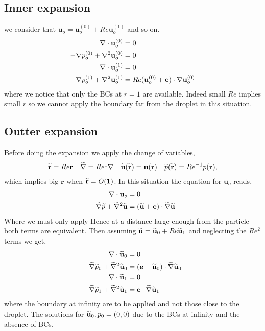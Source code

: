 \subsection{Inner expansion}
we consider that $\textbf{u}_o = \textbf{u}_o^{(0)} + Re \textbf{u}_o^{(1)}$ and so on.
\begin{align}
    \mathbf{\nabla}\cdot \textbf{u}_o^{(0)} &= 0
    \\
    -\mathbf{\nabla} p_o^{(0)} + \mathbf{\nabla}^2 \textbf{u}_o^{(0)}
    &= 0\\
    \mathbf{\nabla}\cdot \textbf{u}_o^{(1)} &= 0
    \\
    -\mathbf{\nabla} p_o^{(1)} + \mathbf{\nabla}^2 \textbf{u}_o^{(1)}
    &=
    Re  (\textbf{u}_o^{(0)} + \textbf{e})\cdot \mathbf{\nabla} \textbf{u}_o^{(0)}\\
\end{align}
where we notice that only the BCs at $r= 1$ are available.
Indeed small $Re$ implies small $r$ so we cannot apply the boundary far from the droplet in this situation.
\subsection{Outter expansion}
Before doing the expansion we apply the change of variables,
\begin{align}
    \widetilde{\textbf{r}} = Re \textbf{r}
    && \widetilde{\mathbf{\nabla}} = Re^{1} \mathbf{\nabla}
    && \widetilde{\textbf{u}}(\widetilde{\textbf{r}}) = \textbf{u}(\textbf{r})
    && \widetilde{p}(\widetilde{\textbf{r}}) = Re^{-1} p(\textbf{r}),
\end{align}
which implies big $\textbf{r}$ when $\widetilde{\textbf{r}} = O(\textbf{1})$.
In this situation the equation for $\textbf{u}_o$ reads,
\begin{align}
    \mathbf{\nabla}\cdot \textbf{u}_{o} &= 0
    \\
    - \widetilde{\mathbf{\nabla}} \widetilde{p} +  \widetilde{\mathbf{\nabla}}^2 \widetilde{\textbf{u}}
    &=
      (\widetilde{\textbf{u}} + \textbf{e})\cdot \widetilde{\mathbf{\nabla}} \widetilde{\textbf{u}}
\end{align}
Where we must only apply
Hence at a distance large enough from the particle both terms are equivalent.
Then assuming $\widetilde{\textbf{u}} = \widetilde{\textbf{u}}_0 + Re\widetilde{\textbf{u}}_1$ and neglecting the $Re^2$ terms we get,
\begin{align}
    \mathbf{\nabla}\cdot \widetilde{\textbf{u}}_0 &= 0
    \\
    - \widetilde{\mathbf{\nabla}} \widetilde{p}_0 +  \widetilde{\mathbf{\nabla}}^2 \widetilde{\textbf{u}}_0
    &=
     (\textbf{e}+ \widetilde{\textbf{u}}_0) \cdot \widetilde{\mathbf{\nabla}} \widetilde{\textbf{u}}_0\\
    \mathbf{\nabla}\cdot \widetilde{\textbf{u}}_1 &= 0
    \\
    - \widetilde{\mathbf{\nabla}} \widetilde{p}_1 +  \widetilde{\mathbf{\nabla}}^2 \widetilde{\textbf{u}}_1
    &=
     \textbf{e} \cdot \widetilde{\mathbf{\nabla}} \widetilde{\textbf{u}}_1
\end{align}
where the boundary at infinity are to be applied and not those close to the droplet.
The solutions for $\widetilde{\textbf{u}}_0, p_0 = (0,0)$ due to the BCs at infinity and the absence of BCs.

